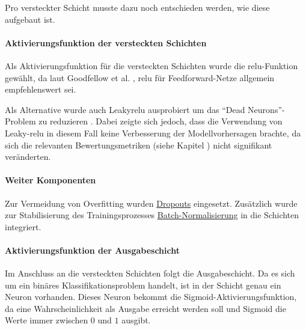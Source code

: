 Pro versteckter Schicht musste dazu noch entschieden werden, wie diese aufgebaut ist. 
\paragraph{Aktivierungsfunktion der versteckten Schichten}
Als Aktivierungsfunktion für die versteckten Schichten wurde die \gls{relu}-Funktion gewählt, da laut Goodfellow et al. \parencite[174]{Goodfellow2016} %
, \gls{relu} für Feedforward-Netze allgemein empfehlenswert sei. 

Als Alternative wurde auch Leaky\gls{relu} ausprobiert um das \enquote{Dead Neurons}-Problem zu reduzieren \cite{Glorot2011}. 
Dabei zeigte sich jedoch, dass die Verwendung von Leaky-\gls{relu} in diesem Fall keine Verbesserung der Modellvorhersagen brachte, da sich die relevanten Bewertungsmetriken (siehe Kapitel ) nicht signifikant veränderten.


\paragraph{Weiter Komponenten}
Zur Vermeidung von Overfitting wurden
\href{https://pytorch.org/docs/stable/generated/torch.nn.Dropout.html}{Dropouts}
eingesetzt. 
Zusätzlich wurde zur Stabilisierung des Trainingsprozesses 
\href{https://pytorch.org/docs/stable/generated/torch.nn.BatchNorm1d.html}{Batch-Normalisierung}
in die Schichten integriert. 

\paragraph{Aktivierungsfunktion der Ausgabeschicht}
Im Anschluss an die versteckten Schichten folgt die Ausgabeschicht. 
Da es sich um ein binäres Klassifikationsproblem handelt, ist in der Schicht genau ein Neuron vorhanden. 
Dieses Neuron bekommt die Sigmoid-Aktivierungsfunktion, da eine Wahrscheinlichkeit als Ausgabe erreicht werden soll und Sigmoid die Werte immer zwischen $0$ und $1$ ausgibt.

